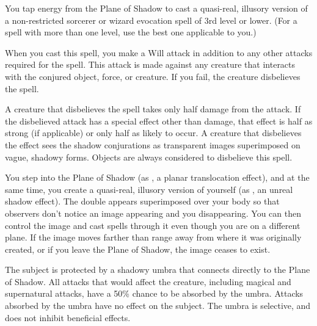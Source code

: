 \spelleffect You tap energy from the Plane of Shadow to cast a quasi-real, illusory version of a non-restricted sorcerer or wizard evocation spell of 3rd level or lower. (For a spell with more than one level, use the best one applicable to you.)
\par When you cast this spell, you make a Will attack in addition to any other attacks required for the spell. This attack is made against any creature that interacts with the conjured object, force, or creature. If you fail, the creature disbelieves the spell.
\par A creature that disbelieves the spell takes only half damage from the attack. If the disbelieved attack has a special effect other than damage, that effect is half as strong (if applicable) or only half as likely to occur.
\spellnotes A creature that disbelieves the effect sees the shadow conjurations as transparent images superimposed on vague, shadowy forms. Objects are always considered to disbelieve this spell.

\spelldur{\durmed}
\spelleffect You step into the Plane of Shadow (as , a planar translocation effect), and at the same time, you create a quasi-real, illusory version of yourself (as , an unreal shadow effect). The double appears superimposed over your body so that observers don't notice an image appearing and you disappearing. You can then control the image and cast spells through it even though you are on a different plane.
\spellnotes If the image moves farther than \rngfar range away from where it was originally created, or if you leave the Plane of Shadow, the image ceases to exist.

\spelldur{\durshort}
\spelleffect The subject is protected by a shadowy umbra that connects directly to the Plane of Shadow. All attacks that would affect the creature, including magical and supernatural attacks, have a 50\% chance to be absorbed by the umbra. Attacks absorbed by the umbra have no effect on the subject. The umbra is selective, and does not inhibit beneficial effects.

